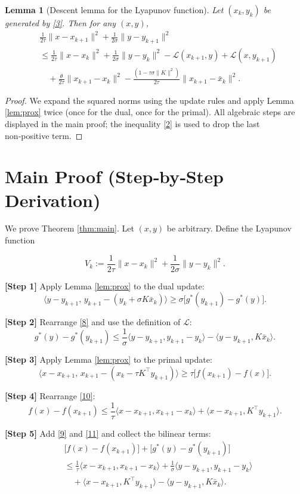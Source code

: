 \documentclass{article}
\newtheorem{lemma}{Lemma}
\begin{document}
\begin{lemma}[Descent lemma for the Lyapunov function]\label{lem:descent}
Let $(x_{k},y_{k})$ be generated by \eqref{3}. Then for any $(x,y)$,
\[
\begin{aligned}
&\frac{1}{2\tau}\|x-x_{k+1}\|^{2}
+\frac{1}{2\sigma}\|y-y_{k+1}\|^{2}\\
&\le
\frac{1}{2\tau}\|x-x_{k}\|^{2}
+\frac{1}{2\sigma}\|y-y_{k}\|^{2}
-\mathcal{L}(x_{k+1},y)+\mathcal{L}(x,y_{k+1})\\
&\quad+\frac{\theta}{2\tau}\|x_{k+1}-x_{k}\|^{2}
-\frac{(1-\tau\sigma\|K\|^{2})}{2\tau}\|x_{k+1}-\bar{x}_{k}\|^{2}.
\end{aligned}
\tag{6}
\]
\end{lemma}
\begin{proof}
We expand the squared norms using the update rules and apply Lemma \ref{lem:prox} twice (once for the dual, once for the primal).  
All algebraic steps are displayed in the main proof; the inequality \eqref{2} is used to drop the last non‑positive term.
\end{proof}

\section*{Main Proof (Step‑by‑Step Derivation)}
We prove Theorem \ref{thm:main}.  
Let $(x,y)$ be arbitrary. Define the Lyapunov function  

\[
V_{k}:=\frac{1}{2\tau}\|x-x_{k}\|^{2}+\frac{1}{2\sigma}\|y-y_{k}\|^{2}.
\tag{7}
\]

\noindent\textbf{[Step 1]} Apply Lemma \ref{lem:prox} to the dual update:
\[
\langle y-y_{k+1},\, y_{k+1}-(y_{k}+\sigma K\bar{x}_{k})\rangle
\ge\sigma\bigl[g^{*}(y_{k+1})-g^{*}(y)\bigr].
\tag{8}
\]

\noindent\textbf{[Step 2]} Rearrange \eqref{8} and use the definition of $\mathcal{L}$:
\[
g^{*}(y)-g^{*}(y_{k+1})\le
\frac{1}{\sigma}\langle y-y_{k+1},y_{k+1}-y_{k}\rangle
-\langle y-y_{k+1},K\bar{x}_{k}\rangle .
\tag{9}
\]

\noindent\textbf{[Step 3]} Apply Lemma \ref{lem:prox} to the primal update:
\[
\langle x-x_{k+1},\, x_{k+1}-(x_{k}-\tau K^{\!\top}y_{k+1})\rangle
\ge\tau\bigl[f(x_{k+1})-f(x)\bigr].
\tag{10}
\]

\noindent\textbf{[Step 4]} Rearrange \eqref{10}:
\[
f(x)-f(x_{k+1})\le
\frac{1}{\tau}\langle x-x_{k+1},x_{k+1}-x_{k}\rangle
+\langle x-x_{k+1},K^{\!\top}y_{k+1}\rangle .
\tag{11}
\]

\noindent\textbf{[Step 5]} Add \eqref{9} and \eqref{11} and collect the bilinear terms:
\[
\begin{aligned}
&\bigl[f(x)-f(x_{k+1})\bigr]+\bigl[g^{*}(y)-g^{*}(y_{k+1})\bigr]\\
&\le\frac{1}{\tau}\langle x-x_{k+1},x_{k+1}-x_{k}\rangle
      +\frac{1}{\sigma}\langle y-y_{k+1},y_{k+1}-y_{k}\rangle\\
&\quad+\langle x-x_{k+1},K^{\!\top}y_{k+1}\rangle
      -\langle y-y_{k+1},K\bar{x}_{k}\rangle .
\end{aligned}
\tag{12}
\]
\end{document}
